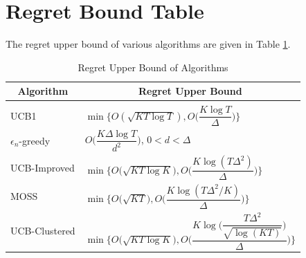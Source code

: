 \section{Regret Bound Table}
\label{App:F}
The regret upper bound of various algorithms are given in Table \ref{sample-table}.
\begin{table}
\caption{Regret Upper Bound of Algorithms}
\label{sample-table}
\begin{center}
\begin{tabular}{l|l}
\multicolumn{1}{c}{\bf Algorithm}  &\multicolumn{1}{c}{\bf Regret Upper Bound} \\
\hline \\
UCB1         &\hspace*{5em}$\min\bigg\lbrace O(\sqrt{KT\log T}) ,O\bigg(\dfrac{K\log T}{\Delta}\bigg)\bigg\rbrace$ \\
$\epsilon_{n}$-greedy         &\hspace*{5em}$O\bigg(\dfrac{K\Delta\log T}{d^{2}}\bigg)$, $0<d<\Delta$ \\
UCB-Improved             &\hspace*{5em}$\min\bigg\lbrace O\bigg(\sqrt{KT\log K}\bigg), O\bigg(\dfrac{K\log (T\Delta^{2})}{\Delta}\bigg)\bigg\rbrace$ \\
MOSS				&\hspace*{5em}$\min\bigg\lbrace O\bigg(\sqrt{KT}\bigg), O\bigg(\dfrac{K\log(T\Delta^{2}/K)}{\Delta}\bigg) \bigg \rbrace$\\
UCB-Clustered             &\hspace*{5em}$\min\bigg\lbrace O\bigg(\sqrt{KT\log K}\bigg),O\bigg(\dfrac{K\log\big (\dfrac{T\Delta^{2}}{\sqrt{\log (KT)}}\big)}{\Delta}\bigg)\bigg\rbrace$\\
\end{tabular}
\end{center}
\end{table}


